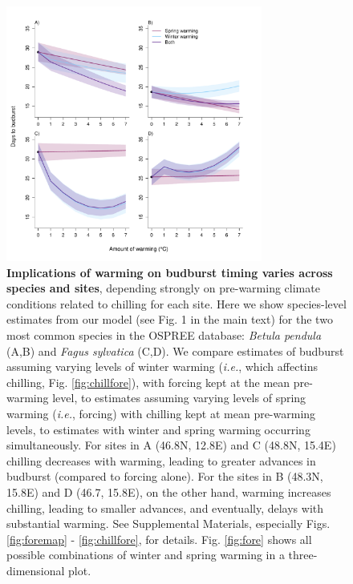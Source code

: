 \documentclass{article}
\begin{document}
\begin{figure}[h!]
\centering
\noindent \includegraphics[width=0.75\textwidth]{..//..//analyses/bb_analysis/figures/forecasting/tempforecastbothspp_1_7_degwarm.pdf}
\caption{\textbf{Implications of warming on budburst timing varies across species and sites}, depending strongly on pre-warming climate conditions related to chilling for each site. Here we show species-level estimates from our model (see Fig. 1 in the main text) for the two most common species in the OSPREE database: \emph{Betula pendula} (A,B) and \emph{Fagus sylvatica} (C,D). We compare estimates of budburst assuming varying levels of winter warming (\emph{i.e.}, which affectins chilling, Fig. \ref{fig:chillfore}), with forcing kept at the mean pre-warming level, to estimates assuming varying levels of spring warming (\emph{i.e.}, forcing) with chilling kept at mean pre-warming levels, to estimates with winter and spring warming occurring simultaneously. For sites in A (46.8\degree N, 12.8\degree E) and C (48.8\degree N, 15.4\degree E) chilling decreases with warming, leading to greater advances in budburst (compared to forcing alone). For the sites in B (48.3\degree N, 15.8\degree E) and D (46.7, 15.8\degree E), on the other hand, warming increases chilling, leading to smaller advances, and eventually, delays with substantial warming.  See Supplemental Materials, especially Figs. \ref{fig:foremap} - \ref{fig:chillfore}, for details. Fig. \ref{fig:fore} shows all possible combinations of winter and spring warming in a three-dimensional plot. }
\label{fig:betpenfagsyl}
\end{figure}
\end{document}
